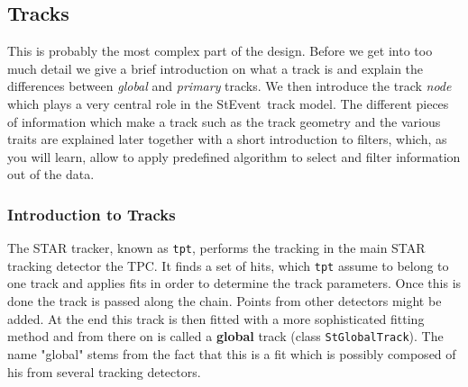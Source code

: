 \documentclass[twoside]{article}
\newcommand{\StEvent}{\textsf{StEvent}}
\begin{document}
\subsection{Tracks}

This is probably the most complex part of the design.  Before we get
into too much detail we give a brief introduction on what a track is
and explain the differences between \emph{global} and \emph{primary}
tracks. We then introduce the track \emph{node} which plays a very
central role in the \StEvent\ track model.  The different pieces of
information which make a track such as the track geometry and the
various traits are explained later together with a short introduction
to filters, which, as you will learn, allow to apply predefined
algorithm to select and filter information out of the data.

\subsubsection{Introduction to Tracks}
 

The STAR tracker, known as \texttt{tpt}, performs the tracking in the
main STAR tracking detector the TPC. It finds a set of hits, which
\texttt{tpt} assume to belong to one track and applies fits in order
to determine the track parameters. Once this is done the track is
passed along the chain.  Points from other detectors might be added.
At the end this track is then fitted with a more sophisticated fitting
method and from there on is called a \textbf{global} track (class
\texttt{StGlobalTrack}).  The name "global" stems from the fact that
this is a fit which is possibly composed of his from several tracking
detectors.
\end{document}
